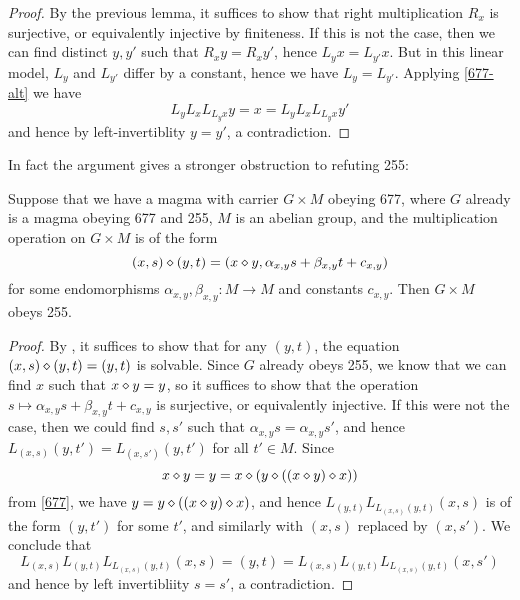 \begin{proof}  By the previous lemma, it suffices to show that right multiplication $R_x$ is surjective, or equivalently injective by finiteness.  If this is not the case, then we can find distinct $y,y'$ such that $R_x y = R_x y'$, hence $L_y x = L_{y'} x$. But in this linear model, $L_y$ and $L_{y'}$ differ by a constant, hence we have $L_y = L_{y'}$.  Applying \eqref{677-alt} we have
$$  L_y L_x L_{L_y x} y = x =  L_y L_x L_{L_y x} y'$$
and hence by left-invertiblity $y=y'$, a contradiction.
\end{proof}

In fact the argument gives a stronger obstruction to refuting 255:

\begin{lemma}\label{linear-2} Suppose that we have a magma with carrier $G \times M$ obeying 677, where $G$ already is a magma obeying 677 and 255, $M$ is an abelian group, and the multiplication operation on $G \times M$ is of the form
  $$ (x,s) \diamond (y,t) = (x \diamond y, \alpha_{x,y} s + \beta_{x,y} t + c_{x,y})$$
for some endomorphisms $\alpha_{x,y},\beta_{x,y}: M \to M$ and constants $c_{x,y}$.  Then $G \times M$ obeys 255.
\end{lemma}

\begin{proof}  By , it suffices to show that for any $(y,t)$, the equation $(x,s) \diamond (y,t) = (y,t)$ is solvable.  Since $G$ already obeys 255, we know that we can find $x$ such that $x \diamond y = y$, so it suffices to show that the operation $s \mapsto \alpha_{x,y} s + \beta_{x,y} t + c_{x,y}$ is surjective, or equivalently injective.  If this were not the case, then we could find $s,s'$ such that $\alpha_{x,y} s = \alpha_{x,y} s'$, and hence $L_{(x,s)} (y,t') = L_{(x,s')} (y,t')$ for all $t' \in M$.  Since
  $$ x \diamond y = y = x \diamond (y \diamond ((x \diamond y) \diamond x))$$
  from \eqref{677}, we have $y = y \diamond ((x \diamond y) \diamond x)$, and hence $L_{(y,t)} L_{L_{(x,s)} (y,t)} (x,s)$ is of the form $(y,t')$ for some $t'$, and similarly with $(x,s)$ replaced by $(x,s')$.  We conclude that
$$ L_{(x,s)} L_{(y,t)} L_{L_{(x,s)} (y,t)} (x,s) = (y,t) =
L_{(x,s)} L_{(y,t)} L_{L_{(x,s)} (y,t)} (x,s')$$
and hence by left invertibliity $s=s'$, a contradiction.
\end{proof}

